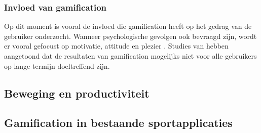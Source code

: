 \subsubsection{Invloed van gamification}
Op dit moment is vooral de invloed die gamification heeft op het gedrag van de gebruiker onderzocht. Wanneer psychologische gevolgen ook bevraagd zijn, wordt er vooral gefocust op motivatie, attitude en plezier \autocite{Hamari2014}. Studies van \textcite{Hamari2013a} hebben aangetoond dat de resultaten van gamification mogelijks niet voor alle gebruikers op lange termijn doeltreffend zijn.

\subsection{Beweging en productiviteit}



\subsection{Gamification in bestaande sportapplicaties}








